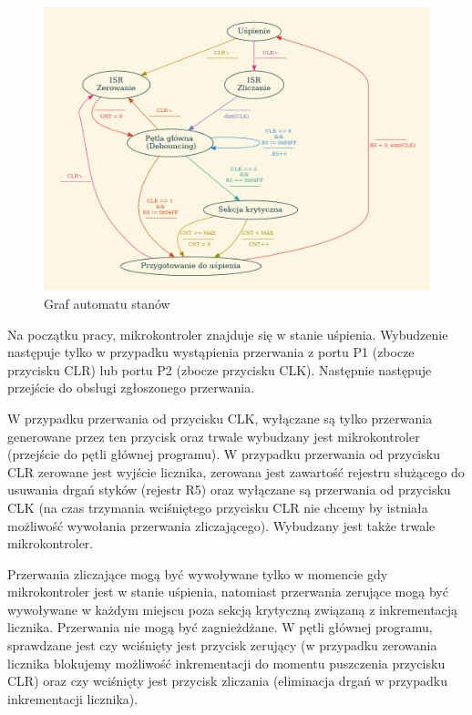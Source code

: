 \documentclass[fleqn]{article}
\begin{document}
\begin{figure}[H]
	\centering
	\includegraphics[width=\textwidth]{assets/graph.png}
	\caption{Graf automatu stanów}
	\label{fig:graph}
\end{figure}


Na początku pracy, mikrokontroler znajduje się w stanie uśpienia. Wybudzenie następuje tylko w przypadku wystąpienia przerwania z portu P1 (zbocze przycisku CLR) lub portu P2 (zbocze przycisku CLK). Następnie następuje przejście do obsługi zgłoszonego przerwania.

W przypadku przerwania od przycisku CLK, wyłączane są tylko przerwania generowane przez ten przycisk oraz trwale wybudzany jest mikrokontroler (przejście do pętli głównej programu). W przypadku przerwania od przycisku CLR zerowane jest wyjście licznika, zerowana jest zawartość rejestru służącego do usuwania drgań styków (rejestr R5) oraz wyłączane są przerwania od przycisku CLK (na czas trzymania wciśniętego przycisku CLR nie chcemy by istniała możliwość wywołania przerwania zliczającego). Wybudzany jest także trwale mikrokontroler.

Przerwania zliczające mogą być wywoływane tylko w momencie gdy mikrokontroler jest w stanie uśpienia, natomiast przerwania zerujące mogą być wywoływane w każdym miejscu poza sekcją krytyczną związaną z inkrementacją licznika. Przerwania nie mogą być zagnieżdżane. W pętli głównej programu, sprawdzane jest czy wciśnięty jest przycisk zerujący (w przypadku zerowania licznika blokujemy możliwość inkrementacji do momentu puszczenia przycisku CLR) oraz czy wciśnięty jest przycisk zliczania (eliminacja drgań w przypadku inkrementacji licznika).
\end{document}

